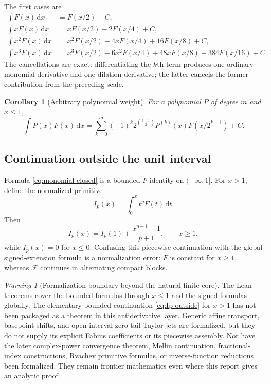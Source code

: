 \documentclass[11pt,oneside]{article}
\numberwithin{equation}{section}
\newtheorem{corollary}[theorem]{Corollary}
\theoremstyle{definition}
\theoremstyle{remark}
\newtheorem{warning}[theorem]{Warning}
\newcommand{\dd}{\,\mathrm d}
\begin{document}
The first cases are
\begin{align}
 \int F(x)\dd x
 &=F(x/2)+C,                                                \label{eq:p0}\\
 \int xF(x)\dd x
 &=xF(x/2)-2F(x/4)+C,                                      \label{eq:p1}\\
 \int x^2F(x)\dd x
 &=x^2F(x/2)-4xF(x/4)+16F(x/8)+C,                          \label{eq:p2}\\
 \int x^3F(x)\dd x
 &=x^3F(x/2)-6x^2F(x/4)+48xF(x/8)-384F(x/16)+C.            \label{eq:p3}
\end{align}
The cancellations are exact: differentiating the $k$th term produces one
ordinary monomial derivative and one dilation derivative; the latter cancels
the former contribution from the preceding scale.

\begin{corollary}[Arbitrary polynomial weight]
\label{cor:polynomial}
For a polynomial $P$ of degree $m$ and $x\le1$,
\begin{equation}
 \boxed{
 \int P(x)F(x)\dd x=
 \sum_{k=0}^{m}(-1)^k2^{\binom{k+1}{2}}
 P^{(k)}(x)F(x/2^{k+1})+C.}                                \label{eq:polynomial-closed}
\end{equation}
\end{corollary}

\subsection{Continuation outside the unit interval}
Formula \eqref{eq:monomial-closed} is a bounded-$F$ identity on
$(-\infty,1]$.
For $x>1$, define the normalized primitive
\begin{equation}
 I_p(x)=\int_0^xt^pF(t)\dd t.                              \label{eq:Ip-def-int}
\end{equation}
Then
\begin{equation}
 I_p(x)=I_p(1)+\frac{x^{p+1}-1}{p+1},\qquad x\ge1,         \label{eq:Ip-outside}
\end{equation}
while $I_p(x)=0$ for $x\le0$.  Confusing this piecewise continuation with the
global signed-extension formula is a normalization error: $F$ is constant for
$x\ge1$, whereas $\mathcal F$ continues in alternating compact blocks.

\begin{warning}[Formalization boundary beyond the natural finite core]
The Lean theorems cover the bounded formulas through $x\le1$ and the signed
formulas globally.  The elementary bounded continuation
\eqref{eq:Ip-outside} for $x>1$ has not been packaged as a theorem in this
antiderivative layer.  Generic affine transport, basepoint shifts, and
open-interval zero-tail Taylor jets are formalized, but they do not supply its
explicit Fabius coefficients or its piecewise assembly.  Nor have the later complex-power convergence theorem,
Mellin continuation, fractional-index constructions, Rvachev primitive
formulas, or inverse-function reductions been formalized.  They remain
frontier mathematics even where this report gives an analytic proof.
\end{warning}
\end{document}
